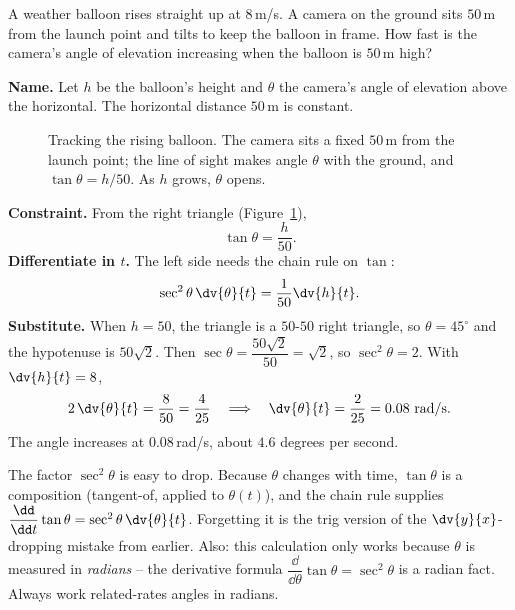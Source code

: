 \begin{example}
\label{ch13:ex-angle}
A weather balloon rises straight up at $8$\,m/s. A camera on the ground sits $50$\,m from the launch
point and tilts to keep the balloon in frame. How fast is the camera's angle of elevation increasing
when the balloon is $50$\,m high?

\textbf{Name.} Let $h$ be the balloon's height and $\theta$ the camera's angle of elevation above the
horizontal. The horizontal distance $50$\,m is constant.

\begin{figure}[H]
\centering
{}
\caption{Tracking the rising balloon. The camera sits a fixed $50$\,m from the launch point; the
line of sight makes angle $\theta$ with the ground, and $\tan\theta = h/50$. As $h$ grows, $\theta$
opens.}
\label{ch13:fig-camera}
\end{figure}

\textbf{Constraint.} From the right triangle (Figure~\ref{ch13:fig-camera}),
\[
\tan\theta = \frac{h}{50}.
\]
\textbf{Differentiate in $t$.} The left side needs the chain rule on $\tan$:
\[
\sec^2\theta\,\dv{\theta}{t} = \frac{1}{50}\dv{h}{t}.
\]
\textbf{Substitute.} When $h=50$, the triangle is a $50$-$50$ right triangle, so $\theta = 45^\circ$
and the hypotenuse is $50\sqrt2$. Then $\sec\theta = \dfrac{50\sqrt2}{50} = \sqrt2$, so
$\sec^2\theta = 2$. With $\dv{h}{t}=8$,
\[
2\,\dv{\theta}{t} = \frac{8}{50} = \frac{4}{25}
\quad\Longrightarrow\quad
\dv{\theta}{t} = \frac{2}{25} = 0.08\ \text{rad/s}.
\]
The angle increases at $0.08$\,rad/s, about $4.6$ degrees per second.
\end{example}

\begin{trapbox}
The factor $\sec^2\theta$ is easy to drop. Because $\theta$ changes with time, $\tan\theta$ is a
composition (tangent-of, applied to $\theta(t)$), and the chain rule supplies
$\dfrac{\dd}{\dd t}\tan\theta = \sec^2\theta\,\dv{\theta}{t}$. Forgetting it is the trig version of
the $\dv{y}{x}$-dropping mistake from earlier. Also: this calculation only works because $\theta$ is
measured in \emph{radians} -- the derivative formula $\dfrac{\dd}{\dd\theta}\tan\theta = \sec^2\theta$
is a radian fact. Always work related-rates angles in radians.
\end{trapbox}

